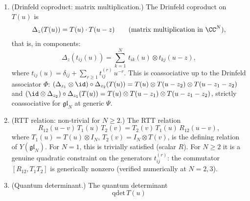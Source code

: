 \begin{theorem}
\begin{enumerate}[label=\textup{(\Roman*)}]
  The Yang--Baxter equation
  \begin{equation}\label{eq:glN-ybe}
    R_{12}(u-v)\, R_{13}(u)\, R_{23}(v)
    = R_{23}(v)\, R_{13}(u)\, R_{12}(u-v)
  \end{equation}
  holds for all $N$ and all $\Psi$
  \textup{(}computed numerically at $N = 2, 3$ by
  \texttt{glN\_affine\_yangian\_chiral\_qg\_engine.py};
  proved algebraically in
  Molev~\textup{\cite{Molev07}},
  Chapter~$1$\textup{)}.
  At $N = 1$: $P = 1$ and $R(u) = u + \Psi$ is scalar,
  recovering the class-$G$ case of
  Theorem~\textup{\ref{thm:w-infty-chiral-qg}}.
\item \textup{(Drinfeld coproduct: matrix multiplication.)}
  The Drinfeld coproduct on $T(u)$ is
  \begin{equation}\label{eq:glN-drinfeld-coprod}
    \Delta_z(T(u)) = T(u) \cdot T(u - z)
    \qquad
    \textup{(matrix multiplication in $\CC^N$)},
  \end{equation}
  that is, in components:
  \begin{equation}\label{eq:glN-coprod-components}
    \Delta_z(t_{ij}(u))
    = \sum_{k=1}^{N}\,
    t_{ik}(u) \otimes t_{kj}(u - z),
  \end{equation}
  where $t_{ij}(u) = \delta_{ij} + \sum_{r \geq 1}
  t_{ij}^{(r)}\, u^{-r}$.
  This is coassociative
  up to the Drinfeld associator $\Phi$:
  $(\Delta_{z_1} \otimes \id) \circ \Delta_{z_2}(T(u))
  = T(u) \otimes T(u - z_2) \otimes T(u - z_1 - z_2)$
  and
  $(\id \otimes \Delta_{z_2}) \circ \Delta_{z_1}(T(u))
  = T(u) \otimes T(u - z_1) \otimes T(u - z_1 - z_2)$,
  strictly coassociative for $\mathfrak{gl}_N$
  at generic $\Psi$.
\item \textup{(RTT relation: non-trivial for $N \geq 2$.)}
  The RTT relation
  \begin{equation}\label{eq:glN-rtt}
    R_{12}(u - v)\, T_1(u)\, T_2(v)
    = T_2(v)\, T_1(u)\, R_{12}(u - v),
  \end{equation}
  where $T_1(u) = T(u) \otimes I_N$,
  $T_2(v) = I_N \otimes T(v)$, is the defining relation of
  $Y(\mathfrak{gl}_N)$.
  For $N = 1$, this is trivially satisfied
  \textup{(}scalar $R$\textup{)}. For $N \geq 2$ it is a
  genuine quadratic constraint on the generators
  $t_{ij}^{(r)}$: the commutator $[R_{12}, T_1 T_2]$
  is generically nonzero
  \textup{(}verified numerically at $N = 2, 3$\textup{)}.
\item \textup{(Quantum determinant.)}
  The quantum determinant
  \begin{equation}\label{eq:glN-qdet}
    \mathrm{qdet}\, T(u)

\end{equation}
\end{enumerate}
\end{theorem}
